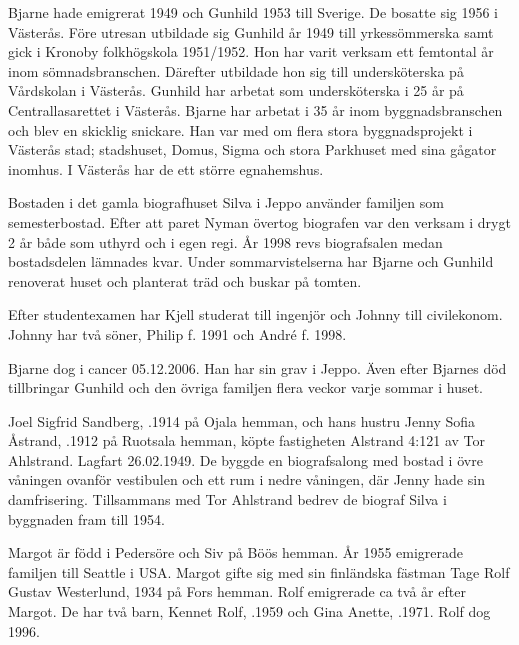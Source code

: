 Bjarne	hade emigrerat 1949 och Gunhild 1953 till Sverige. De	bosatte sig 1956 i Västerås. Före utresan utbildade sig Gunhild år 1949 till yrkessömmerska samt gick i Kronoby folkhögskola 1951/1952. Hon har varit verksam ett femtontal år inom sömnadsbranschen. Därefter utbildade hon sig till	undersköterska på Vårdskolan i Västerås. Gunhild har arbetat som undersköterska i 25 år på Centrallasarettet i	Västerås. Bjarne har arbetat i 35 år inom byggnadsbranschen	och blev en skicklig snickare. Han var med om flera stora	byggnadsprojekt i Västerås stad; stadshuset, Domus, Sigma	och stora Parkhuset med sina gågator inomhus. I Västerås har de ett större egnahemshus.

Bostaden i det gamla biografhuset Silva i Jeppo använder familjen som semesterbostad. Efter att paret Nyman övertog	biografen var den verksam i drygt 2 år både som uthyrd och i egen regi. År 1998 revs biografsalen medan bostadsdelen lämnades kvar. Under sommarvistelserna har Bjarne och Gunhild renoverat huset och planterat träd och buskar på tomten.
\begin{jhchildren}
  \item {}
  \item {}
\end{jhchildren}
Efter studentexamen har Kjell studerat till ingenjör och Johnny till civilekonom. Johnny har två söner, Philip f. 1991 och André f. 1998.

Bjarne dog i cancer 05.12.2006. Han har sin grav i Jeppo. Även efter Bjarnes död tillbringar Gunhild och den övriga familjen flera veckor varje sommar i huset.


%
Joel Sigfrid Sandberg, .1914 på Ojala hemman, och hans hustru Jenny Sofia Åstrand, .1912 på	Ruotsala hemman, köpte fastigheten Alstrand 4:121 av Tor Ahlstrand. Lagfart 26.02.1949. De byggde en biografsalong med bostad i övre våningen ovanför vestibulen och ett rum	i nedre våningen, där Jenny hade sin damfrisering. Tillsammans med Tor Ahlstrand bedrev de biograf Silva i byggnaden fram till 1954.
\begin{jhchildren}
  \item {}
  \item {}
\end{jhchildren}
Margot är född i Pedersöre och Siv på Böös hemman. År 1955 emigrerade familjen till Seattle i USA. Margot gifte sig	med sin finländska fästman Tage Rolf Gustav Westerlund,  1934 på Fors hemman. Rolf emigrerade ca två år efter Margot. De har två barn, Kennet Rolf, .1959 och Gina Anette, .1971. Rolf dog 1996.

